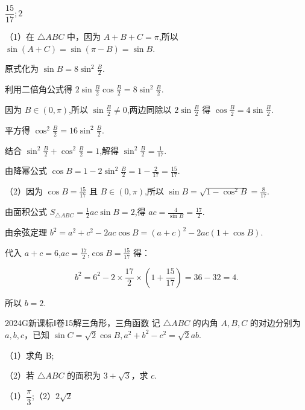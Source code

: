 \documentclass[12pt,UTF-8,a4paper]{ctexart}
\numberwithin{figure}{section}
\theoremstyle{mystyle}
\theoremstyle{mystylekaishu}
\theoremstyle{mystyle}
\numberwithin{xiti}{section}
\begin{document}
\begin{answer}
$\displaystyle\dfrac{15}{17}; 2$
\end{answer}

\begin{solutions}
（1）在 $\triangle ABC$ 中，因为 $A+B+C=\pi$,所以 $\sin(A+C)=\sin(\pi-B)=\sin B$.

原式化为 $\sin B=8\sin^2\frac{B}{2}$.

利用二倍角公式得 $2\sin\frac{B}{2}\cos\frac{B}{2}=8\sin^2\frac{B}{2}$.

因为 $B\in(0,\pi)$,所以 $\sin\frac{B}{2}\neq 0$,两边同除以 $2\sin\frac{B}{2}$ 得 $\cos\frac{B}{2}=4\sin\frac{B}{2}$.

平方得 $\cos^2\frac{B}{2}=16\sin^2\frac{B}{2}$.

结合 $\sin^2\frac{B}{2}+\cos^2\frac{B}{2}=1$,解得 $\sin^2\frac{B}{2}=\displaystyle\frac{1}{17}$.

由降幂公式 $\cos B=1-2\sin^2\frac{B}{2}=1-\displaystyle\frac{2}{17}=\displaystyle\frac{15}{17}$.

（2）因为 $\cos B=\displaystyle\frac{15}{17}$ 且 $B\in(0,\pi)$,所以 $\sin B=\sqrt{1-\cos^2 B}=\displaystyle\frac{8}{17}$.

由面积公式 $S_{\triangle ABC}=\displaystyle\frac{1}{2}ac\sin B=2$,得 $ac=\displaystyle\frac{4}{\sin B}=\displaystyle\frac{17}{2}$.

由余弦定理 $b^2=a^2+c^2-2ac\cos B=(a+c)^2-2ac(1+\cos B)$.

代入 $a+c=6$,$ac=\displaystyle\frac{17}{2}$,$\cos B=\displaystyle\frac{15}{17}$ 得：

$$
b^2=6^2-2\times\displaystyle\frac{17}{2}\times\left(1+\displaystyle\frac{15}{17}\right)=36-32=4.
$$

所以 $b=\boxed{2}$.
\end{solutions}


\begin{problem}{2024}{G}{新课标Ⅰ卷}{15}{解三角形，三角函数}
记 $\triangle ABC$ 的内角 $A,B,C$ 的对边分别为 $a,b,c$，已知 $\sin C=\sqrt{2}\cos B, a^2+b^2-c^2=\sqrt{2}ab$.

（1）求角 B;

（2）若 $\triangle ABC$ 的面积为 $3+\sqrt{3}$，求 $c$.
\end{problem}

\begin{answer}
（1）$\dfrac{\pi}{3}$;（2）$2\sqrt{2}$
\end{answer}
\end{document}
